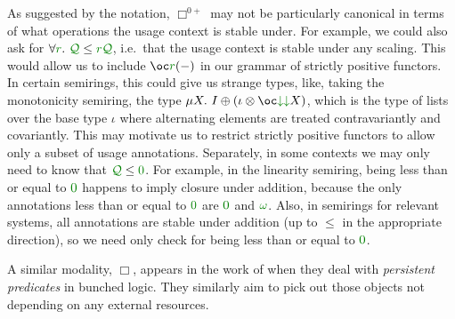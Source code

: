 As suggested by the notation, $\Box^{0{+}}$ may not be particularly canonical in
terms of what operations the usage context is stable under.
For example, we could also ask for $\forall \gr r.~\grQ \leq \gr r\grQ$, i.e.\
that the usage context is stable under any scaling.
This would allow us to include $\oc\gr r(-)$ in our grammar of strictly positive
functors.
In certain semirings, this could give us strange types, like, taking the
monotonicity semiring, the type
$\mu X.~I \oplus (\iota \otimes \oc\gr{\downarrow\downarrow} X)$,
which is the type of lists over the base type $\iota$ where alternating elements
are treated contravariantly and covariantly.
This may motivate us to restrict strictly positive functors to allow only a
subset of usage annotations.
Separately, in some contexts we may only need to know that $\grQ \leq \gr0$.
For example, in the linearity semiring, being less than or equal to $\gr0$
happens to imply closure under addition, because the only annotations less than
or equal to $\gr0$ are $\gr0$ and $\gr\omega$.
Also, in semirings for relevant systems, all annotations are stable under
addition (up to $\leq$ in the appropriate direction), so we need only check for
being less than or equal to $\gr0$.

A similar modality, $\Box$, appears in the work of \citet{BB18} when they deal
with \emph{persistent predicates} in bunched logic.
They similarly aim to pick out those objects not depending on any external
resources.
